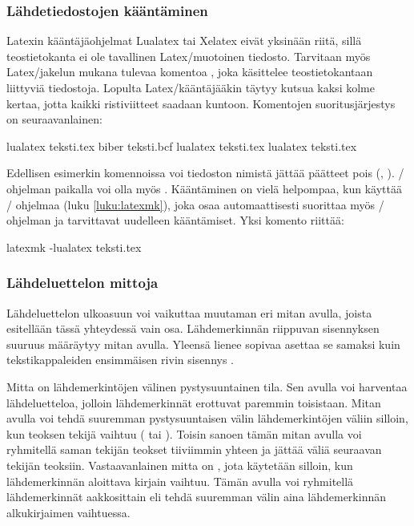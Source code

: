\subsubsection{Lähdetiedostojen kääntäminen}

Latexin kääntäjäohjelmat Lualatex tai Xelatex eivät yksinään riitä,
sillä teostietokanta ei ole tavallinen Latex\-/muotoinen tiedosto.
Tarvitaan myös Latex\-/jakelun mukana tulevaa komentoa ,
joka käsittelee teostietokantaan liittyviä tiedostoja. Lopulta
Latex\-/kääntäjääkin täytyy kutsua kaksi kolme kertaa, jotta kaikki
ristiviitteet saadaan kuntoon. Komentojen suoritusjärjestys on
seuraavanlainen:

\begin{koodilohkosis}
lualatex teksti.tex
biber teksti.bcf
lualatex teksti.tex
lualatex teksti.tex
\end{koodilohkosis}

Edellisen esimerkin komennoissa voi tiedoston nimistä jättää päätteet
pois (, ). \-/ ohjelman paikalla
voi olla myös . Kääntäminen on vielä helpompaa, kun
käyttää \-/ ohjelmaa (luku \ref{luku:latexmk}), joka osaa
automaattisesti suorittaa myös \-/ ohjelman ja tarvittavat
uudelleen kääntämiset. Yksi komento riittää:

\begin{koodilohkosis}
latexmk -lualatex teksti.tex    %
\end{koodilohkosis}

\subsubsection{Lähdeluettelon mittoja}

Lähdeluettelon ulkoasuun voi vaikuttaa muutaman eri mitan avulla, joista
esitellään tässä yhteydessä vain osa. Lähdemerkinnän riippuvan
sisennyksen suuruus määräytyy mitan  avulla. Yleensä
lienee sopivaa asettaa se samaksi kuin tekstikappaleiden ensimmäisen
rivin sisennys .

\begin{koodilohkosis}
\setlength{\parindent}{1.1em} %
\setlength{\bibhang}{\parindent}
\end{koodilohkosis}

Mitta  on lähdemerkintöjen välinen pystysuuntainen
tila.  Sen avulla voi harventaa lähdeluetteloa,
jolloin lähdemerkinnät erottuvat paremmin toisistaan. Mitan
 avulla voi tehdä suuremman pystysuuntaisen välin
lähdemerkintöjen väliin silloin, kun teoksen tekijä vaihtuu
( tai ). Toisin sanoen tämän mitan avulla
voi ryhmitellä saman tekijän teokset tiiviimmin yhteen ja jättää väliä
seuraavan tekijän teoksiin. Vastaavanlainen mitta on
, jota käytetään silloin, kun lähdemerkinnän
aloittava kirjain vaihtuu. Tämän avulla voi ryhmitellä lähdemerkinnät
aakkosittain eli tehdä suuremman välin aina lähdemerkinnän alkukirjaimen
vaihtuessa.


